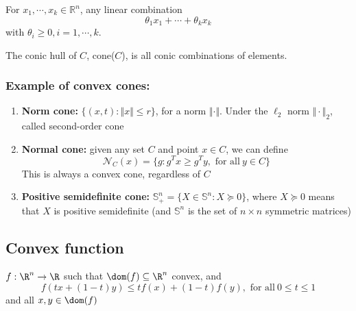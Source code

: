 \documentclass[a4paper]{article}
\begin{document}
{\begin{defi}
  For $x_1,\cdots,x_k \in \mathbb{R}^n$, any linear combination
  \[
    \theta_1 x_1 + \cdots + \theta_k x_k
    \]
  with $\theta_i \geq 0, i=1,\cdots, k$.
\end{defi}

\begin{defi}
  The conic hull of $ C $, cone($C$), is all conic combinations of elements.
\end{defi}

\subsubsection{Example of convex cones:}
\begin{enumerate}
  \item \textbf{Norm cone:} $\{(x,t) : \Vert x \Vert \leq r \}$, for a norm $\Vert \cdot \Vert$. Under the $\ell_2$ norm $\Vert \cdot \Vert_2$, called second-order cone
  \item \textbf{Normal cone:} given any set $C$ and point $x \in C$, we can define
  \[
    \mathcal{N}_C (x) = \{g : g^T x \geq g^T y, \text{\ for \ all} \ y \in C\} 
    \]
  This is always a convex cone, regardless of $C$
  \item \textbf{Positive semidefinite cone:} $\mathbb{S}^n_+ = \{X \in \mathbb{S}^n : X \succeq 0 \}$, where $X \succeq 0 $ means that $X$ is positive semidefinite (and $\mathbb{S}^n$ is the set of $n \times n$ symmetric matrices)
\end{enumerate}

\subsection{Convex function}
\begin{defi}
  $f: \R^n \rightarrow \R$ such that $\dom (f) \subseteq \R^n$ convex, and 
  \[
      f(tx + (1-t)y) \leq tf(x) + (1-t)f(y),\text{\ for\ all}\ 0 \leq t \leq 1 
  \]
  and all $x, y \in \dom (f)$
\end{defi}

\begin{center}
\end{center}

}
\end{document}
